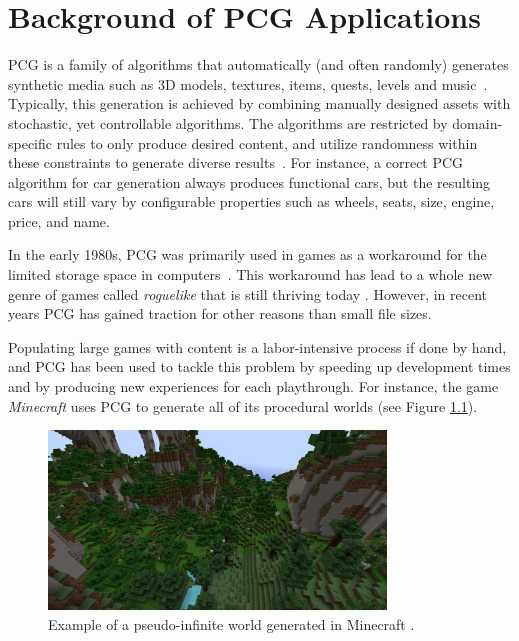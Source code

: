 \chapter{Background of PCG Applications}


PCG is a family of algorithms that automatically (and often randomly) generates synthetic media such as 3D models, textures, items, quests, levels and music~\cite[p.1]{pcg_in_games}.
Typically, this generation is achieved by combining manually designed assets with stochastic, yet controllable algorithms.
The algorithms are restricted by domain-specific rules to only produce desired content, and utilize randomness within these constraints to generate diverse results~\cite{gamasutra}.
For instance, a correct PCG algorithm for car generation always produces functional cars, but the resulting cars will still vary by configurable properties such as wheels, seats, size, engine, price, and name.

In the early 1980s, PCG was primarily used in games as a workaround for the limited storage space in computers~\cite[p.4]{pcg_in_games}.
This workaround has lead to a whole new genre of games called \textit{roguelike} that is still thriving today \cite{roguelikes}.
However, in recent years PCG has gained traction for other reasons than small file sizes.

Populating large games with content is a labor-intensive process if done by hand, and PCG has been used to tackle this problem by speeding up development times and by producing new experiences for each playthrough.
For instance, the game \textit{Minecraft} \cite{minecraft} uses PCG to generate all of its procedural worlds (see Figure \ref{fig:minecraft}).

\begin{figure}[h!]
  \centering

  \includegraphics[width=0.8\textwidth]{figure/minecraft.jpg}
  \caption{Example of a pseudo-infinite world generated in Minecraft \cite{minecraft_img}.}

  \label{fig:minecraft}
\end{figure}

